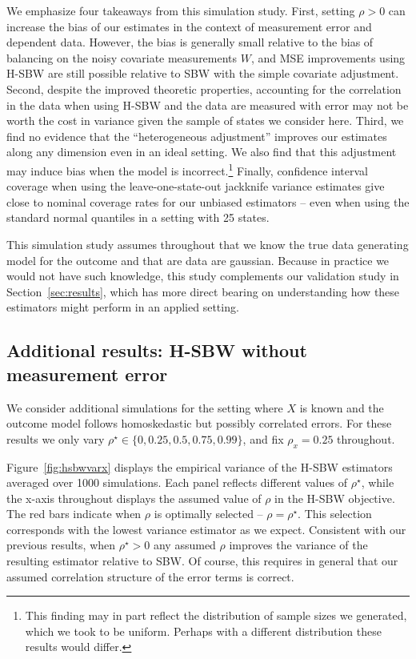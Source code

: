 We emphasize four takeaways from this simulation study. First, setting $\rho > 0$ can increase the bias of our estimates in the context of measurement error and dependent data. However, the bias is generally small relative to the bias of balancing on the noisy covariate measurements $W$, and MSE improvements using H-SBW are still possible relative to SBW with the simple covariate adjustment. Second, despite the improved theoretic properties, accounting for the correlation in the data when using H-SBW and the data are measured with error may not be worth the cost in variance given the sample of states we consider here. Third, we find no evidence that the ``heterogeneous adjustment'' improves our estimates along any dimension even in an ideal setting. We also find that this adjustment may induce bias when the model is incorrect.\footnote{This finding may in part reflect the distribution of sample sizes we generated, which we took to be uniform. Perhaps with a different distribution these results would differ.} Finally, confidence interval coverage when using the leave-one-state-out jackknife variance estimates give close to nominal coverage rates for our unbiased estimators -- even when using the standard normal quantiles in a setting with 25 states. 

This simulation study assumes throughout that we know the true data generating model for the outcome and that are data are gaussian. Because in practice we would not have such knowledge, this study complements our validation study in Section~\ref{sec:results}, which has more direct bearing on understanding how these estimators might perform in an applied setting.

\subsection{Additional results: H-SBW without measurement error}\label{appssec:simstudyresults2}

We consider additional simulations for the setting where $X$ is known and the outcome model follows homoskedastic but possibly correlated errors. For these results we only vary $\rho^\star \in \{0, 0.25, 0.5, 0.75, 0.99\}$, and fix $\rho_x = 0.25$ throughout. 

Figure~\ref{fig:hsbwvarx} displays the empirical variance of the H-SBW estimators averaged over 1000 simulations. Each panel reflects different values of $\rho^\star$, while the x-axis throughout displays the assumed value of $\rho$ in the H-SBW objective. The red bars indicate when $\rho$ is optimally selected -- $\rho = \rho^\star$. This selection corresponds with the lowest variance estimator as we expect. Consistent with our previous results, when $\rho^\star > 0$ any assumed $\rho$ improves the variance of the resulting estimator relative to SBW. Of course, this requires in general that our assumed correlation structure of the error terms is correct.

